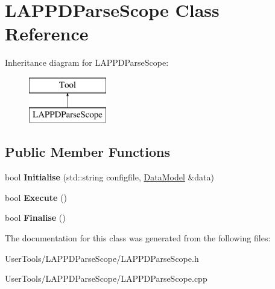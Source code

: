 \hypertarget{classLAPPDParseScope}{\section{L\-A\-P\-P\-D\-Parse\-Scope Class Reference}
\label{classLAPPDParseScope}
}
Inheritance diagram for L\-A\-P\-P\-D\-Parse\-Scope\-:\begin{figure}[H]
\begin{center}
\leavevmode
\includegraphics[height=2.000000cm]{classLAPPDParseScope}
\end{center}
\end{figure}
\subsection*{Public Member Functions}
\begin{DoxyCompactItemize}
\item 
\hypertarget{classLAPPDParseScope_a5b2511aa79384f73240784028b39d427}{bool {\bfseries Initialise} (std\-::string configfile, \hyperlink{classDataModel}{Data\-Model} \&data)}\label{classLAPPDParseScope_a5b2511aa79384f73240784028b39d427}

\item 
\hypertarget{classLAPPDParseScope_ade2b40ff4ad384ab3778cb991bde62b6}{bool {\bfseries Execute} ()}\label{classLAPPDParseScope_ade2b40ff4ad384ab3778cb991bde62b6}

\item 
\hypertarget{classLAPPDParseScope_a7582fc226353ddceea5a73ff48d8c6a1}{bool {\bfseries Finalise} ()}\label{classLAPPDParseScope_a7582fc226353ddceea5a73ff48d8c6a1}

\end{DoxyCompactItemize}


The documentation for this class was generated from the following files\-:\begin{DoxyCompactItemize}
\item 
User\-Tools/\-L\-A\-P\-P\-D\-Parse\-Scope/L\-A\-P\-P\-D\-Parse\-Scope.\-h\item 
User\-Tools/\-L\-A\-P\-P\-D\-Parse\-Scope/L\-A\-P\-P\-D\-Parse\-Scope.\-cpp\end{DoxyCompactItemize}
